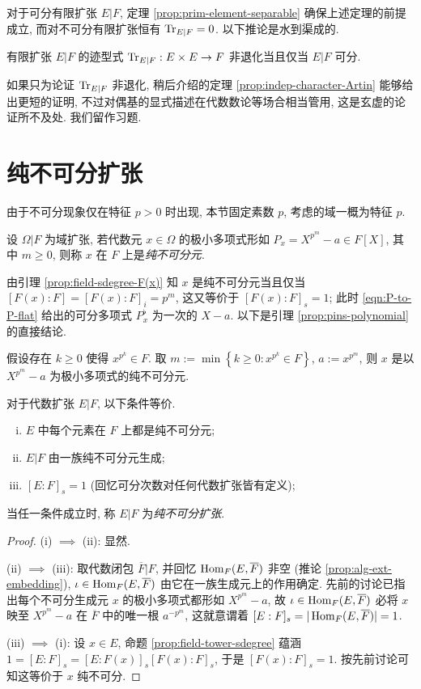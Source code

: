 对于可分有限扩张 $E|F$, 定理 \ref{prop:prim-element-separable} 确保上述定理的前提成立, 而对不可分有限扩张恒有 $\operatorname{Tr}_{E|F}=0$. 以下推论是水到渠成的.
\begin{corollary}\label{prop:separable-discriminant}
	有限扩张 $E|F$ 的迹型式 $\operatorname{Tr}_{E|F}: E \times E \to F$ 非退化当且仅当 $E|F$ 可分.
\end{corollary}

如果只为论证 $\operatorname{Tr}_{E|F}$ 非退化, 稍后介绍的定理 \ref{prop:indep-character-Artin} 能够给出更短的证明, 不过对偶基的显式描述在代数数论等场合相当管用, 这是玄虚的论证所不及处. 我们留作习题.

\section{纯不可分扩张}\label{sec:pins}
由于不可分现象仅在特征 $p > 0$ 时出现, 本节固定素数 $p$, 考虑的域一概为特征 $p$.
\begin{definition}[纯不可分元]
	设 $\Omega|F$ 为域扩张, 若代数元 $x \in \Omega$ 的极小多项式形如 $P_x = X^{p^m}-a \in F[X]$, 其中 $m \geq 0$, 则称 $x$ 在 $F$ 上是\emph{纯不可分元}.
\end{definition}
由引理 \ref{prop:field-sdegree-F(x)} 知 $x$ 是纯不可分元当且仅当 $[F(x):F] = [F(x):F]_i = p^m$, 这又等价于 $[F(x):F]_s = 1$; 此时 \eqref{eqn:P-to-P-flat} 给出的可分多项式 $P^\flat_x$ 为一次的 $X-a$. 以下是引理 \ref{prop:pins-polynomial} 的直接结论.

\begin{proposition}
	假设存在 $k \geq 0$ 使得 $x^{p^k} \in F$. 取 $m := \min\left\{k \geq 0 : x^{p^k} \in F \right\}$, $a := x^{p^m}$, 则 $x$ 是以 $X^{p^m}-a$ 为极小多项式的纯不可分元.
\end{proposition}

\begin{definition-theorem}\label{def:pins}
	对于代数扩张 $E|F$, 以下条件等价.
	\begin{enumerate}[(i)]
		\item $E$ 中每个元素在 $F$ 上都是纯不可分元;
		\item $E|F$ 由一族纯不可分元生成;
		\item $[E:F]_s = 1$ (回忆可分次数对任何代数扩张皆有定义);
	\end{enumerate}
	当任一条件成立时, 称 $E|F$ 为\emph{纯不可分扩张}.
\end{definition-theorem}
\begin{proof}
	(i) $\implies$ (ii): 显然.

	(ii) $\implies$ (iii): 取代数闭包 $\overline{F}|F$, 并回忆 $\operatorname{Hom}_F(E, \overline{F})$ 非空 (推论 \ref{prop:alg-ext-embedding}), $\iota \in \operatorname{Hom}_F(E, \overline{F})$ 由它在一族生成元上的作用确定. 先前的讨论已指出每个不可分生成元 $x$ 的极小多项式都形如 $X^{p^m} - a$, 故 $\iota \in \operatorname{Hom}_F(E, \overline{F})$ 必将 $x$ 映至 $X^{p^m} - a$ 在 $\overline{F}$ 中的唯一根 $a^{-p^m}$, 这就意谓着 $[E:F]_s = |\operatorname{Hom}_F(E, \overline{F})| = 1$.
	
	(iii) $\implies$ (i): 设 $x \in E$, 命题 \ref{prop:field-tower-sdegree} 蕴涵 $1 = [E:F]_s = [E:F(x)]_s [F(x):F]_s$, 于是 $[F(x):F]_s = 1$. 按先前讨论可知这等价于 $x$ 纯不可分.
\end{proof}

